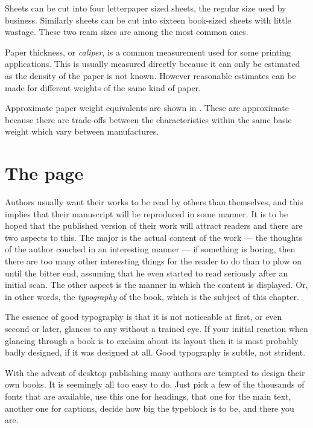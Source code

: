 \documentclass[10pt,letterpaper,extrafontsizes]{memoir}
\newcommand*{\half}{\slashfrac{1}{2}}
\begin{document}
    
    Sheets  can be cut into four \abybm{8\,\half}{11}{in}
letterpaper sized sheets, the regular size used by business. 
Similarly sheets  can be cut into sixteen
 book-sized sheets with little wastage. These two ream sizes
are among the most common ones.

    Paper thickness, or \emph{caliper}, is a common measurement
used for some printing applications. This is usually measured directly
because it can only be estimated as the density of the paper is not known.
However reasonable estimates can be made for different weights of
the same kind of paper.

    Approximate paper weight equivalents are shown in .
These are approximate because there are trade-offs between the characteristics
within the same basic weight which vary between manufactures.

   


\chapter{The page}  \label{chap:lpage}

    Authors usually want their works to be read by others than themselves,
and this implies that their manuscript will be reproduced in some manner.
It is to be hoped that the published version of their work will attract 
readers and there are two aspects to this. The major is the actual content
of the work --- the thoughts of the author couched in an interesting
manner --- if something is boring, then there are too many other interesting
things for the reader to do than to plow on until the bitter end, 
assuming that he
even started to read seriously after an initial scan. The other aspect is
the manner in which the content is displayed. Or, in other words, 
the \emph{typography}
of the book, which is the subject of this chapter.

    The essence of good typography is that it is not noticeable at first,
or even second or later, glances to any without a trained eye. If your
initial reaction when glancing through a book is to exclaim about its layout
then it is most probably badly designed, if it was designed at all. Good
typography is subtle, not strident. 

    With the advent of desktop publishing
many authors are tempted to design their own books. It is seemingly all
too easy to do. Just pick a few of the thousands of fonts that are available,
use this one for headings, 
that one for the main text, another one for
captions, decide how big the typeblock is to be, and there you are.
\end{document}
